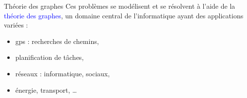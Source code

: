 \documentclass[10pt]{beamer}
\begin{document}
\begin{frame}[fragile]{\Ctitle}{\stitle}
	\begin{block}{Théorie des graphes}
		Ces problèmes se modélisent et se résolvent à l'aide de la \textcolor{blue}{théorie des graphes}, un domaine central de l'informatique ayant des applications variées :
		\begin{itemize}
			\item<1-> {\sc gps} : recherches de chemins,
			\item<2-> planification de tâches,
			\item<3-> réseaux : informatique, sociaux, 
			\item<4-> énergie, transport, \dots
		\end{itemize}
	\end{block}
\end{frame}
\end{document}
